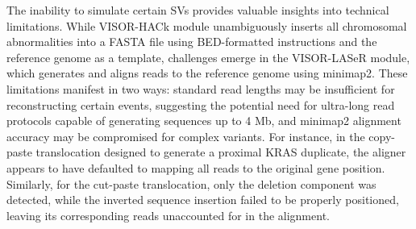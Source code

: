 The inability to simulate certain SVs provides valuable insights into technical 
limitations. While VISOR-HACk module unambiguously inserts all chromosomal 
abnormalities into a FASTA file using BED-formatted instructions and the 
reference genome as a template, challenges emerge in the VISOR-LASeR module,
which generates and aligns reads to the reference genome using minimap2. These 
limitations manifest in two ways: standard read lengths may be insufficient for 
reconstructing certain events, suggesting the potential need for ultra-long read 
protocols capable of generating sequences up to 4 Mb, and minimap2 alignment 
accuracy may be compromised for complex variants. For instance, in the 
copy-paste translocation designed to generate a proximal KRAS duplicate, the 
aligner appears to have defaulted to mapping all reads to the original gene 
position. Similarly, for the cut-paste translocation, only the deletion 
component was detected, while the inverted sequence insertion failed to be 
properly positioned, leaving its corresponding reads unaccounted for in the 
alignment.



